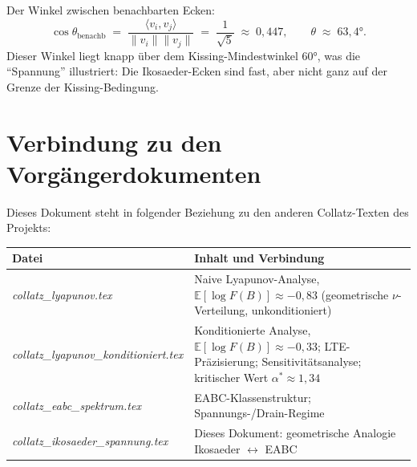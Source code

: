 \documentclass[12pt,a4paper]{article}
\newcommand{\E}{\mathbb{E}}
\newcommand{\logF}{\log F(B)}
\begin{document}
Der Winkel zwischen benachbarten Ecken:
\[
  \cos\theta_{\text{benachb}} \;=\;
  \frac{\langle v_i, v_j\rangle}{\|v_i\|\|v_j\|}
  \;=\; \frac{1}{\sqrt{5}} \;\approx\; 0{,}447,
  \qquad \theta \;\approx\; 63{,}4°.
\]
Dieser Winkel liegt knapp über dem Kissing-Mindestwinkel $60°$, was die
``Spannung'' illustriert: Die Ikosaeder-Ecken sind fast, aber nicht ganz
auf der Grenze der Kissing-Bedingung.

\section{Verbindung zu den Vorgängerdokumenten}
\label{app:verbindung}

Dieses Dokument steht in folgender Beziehung zu den anderen Collatz-Texten
des Projekts:

\begin{center}
\renewcommand{\arraystretch}{1.3}
\begin{tabular}{l p{9cm}}
\toprule
\textbf{Datei} & \textbf{Inhalt und Verbindung} \\
\midrule
\textit{collatz\_lyapunov.tex}
  & Naive Lyapunov-Analyse, $\E[\logF] \approx -0{,}83$
    (geometrische $\nu$-Verteilung, unkonditioniert) \\
\textit{collatz\_lyapunov\_konditioniert.tex}
  & Konditionierte Analyse, $\E[\logF] \approx -0{,}33$;
    LTE-Präzisierung; Sensitivitätsanalyse;
    kritischer Wert $\alpha^* \approx 1{,}34$ \\
\textit{collatz\_eabc\_spektrum.tex}
  & EABC-Klassenstruktur; Spannungs-/Drain-Regime \\
\textit{collatz\_ikosaeder\_spannung.tex}
  & Dieses Dokument: geometrische Analogie Ikosaeder $\leftrightarrow$ EABC \\
\bottomrule
\end{tabular}
\end{center}
\end{document}
